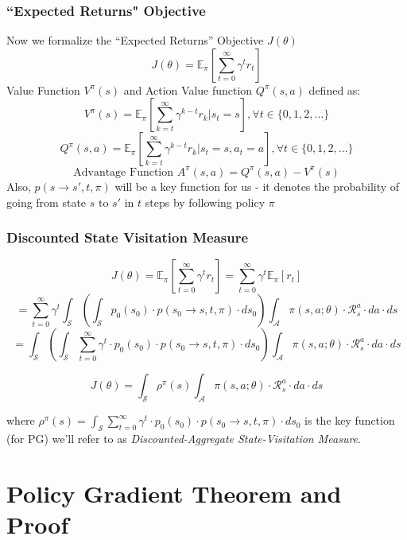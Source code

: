 \documentclass[handout]{beamer}
\begin{document}
\begin{frame}
\frametitle{``Expected Returns" Objective}
\pause
Now we formalize the ``Expected Returns'' Objective $J(\theta)$
$$J(\theta) = \mathbb{E}_{\pi}[\sum_{t=0}^\infty \gamma^t r_t]$$
\pause
Value Function $V^{\pi}(s)$ and Action Value function $Q^{\pi}(s,a)$ defined as:
$$V^{\pi}(s) = \mathbb{E}_{\pi}[\sum_{k=t}^\infty \gamma^{k-t} r_k|s_t=s], \forall t \in \{0, 1, 2, \ldots\}$$
$$Q^{\pi}(s,a) = \mathbb{E}_{\pi}[\sum_{k=t}^\infty \gamma^{k-t} r_k|s_t=s, a_t=a], \forall t \in \{0, 1, 2, \ldots\}$$
\pause
$$\mbox{Advantage Function } A^{\pi}(s,a) = Q^{\pi}(s,a) - V^{\pi}(s)$$
\pause
Also, $p(s \rightarrow s', t, \pi)$ will be a key function for us - it denotes the probability of going from state $s$ to $s'$ in $t$ steps by following policy $\pi$
\end{frame}

\begin{frame}
\frametitle{Discounted State Visitation Measure}
\pause
$$J(\theta) = \mathbb{E}_{\pi}[\sum_{t=0}^\infty \gamma^t r_t] = \sum_{t=0}^\infty \gamma^t \mathbb{E}_{\pi}[r_t]$$
\pause
$$ = \sum_{t=0}^\infty \gamma^t \int_{\mathcal{S}} (\int_{\mathcal{S}}  p_0(s_0) \cdot p(s_0 \rightarrow s, t, \pi) \cdot ds_0) \int_{\mathcal{A}} \pi(s,a; \theta) \cdot \mathcal{R}_s^a \cdot da \cdot ds$$
\pause
$$ =  \int_{\mathcal{S}} (\int_{\mathcal{S}}  \sum_{t=0}^\infty \gamma^t \cdot p_0(s_0) \cdot p(s_0 \rightarrow s, t, \pi) \cdot ds_0) \int_{\mathcal{A}} \pi(s,a; \theta) \cdot \mathcal{R}_s^a \cdot da \cdot ds$$
\pause
\begin{definition}
$$J(\theta) =  \int_{\mathcal{S}} \rho^{\pi}(s) \int_{\mathcal{A}} \pi(s,a; \theta) \cdot \mathcal{R}_s^a \cdot da \cdot ds$$
\end{definition}
\pause
where $\rho^{\pi}(s) = \int_{\mathcal{S}}  \sum_{t=0}^\infty \gamma^t \cdot p_0(s_0) \cdot p(s_0 \rightarrow s, t, \pi) \cdot ds_0$ is the key function (for PG) we'll refer to as {\em Discounted-Aggregate State-Visitation Measure}.
\end{frame}

\section{Policy Gradient Theorem and Proof}
\end{document}
